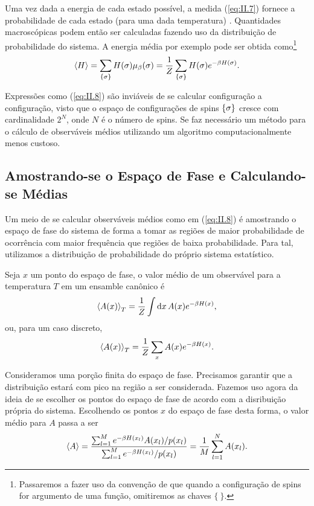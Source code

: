 Uma vez dada a energia de cada estado possível, a medida (\ref{eq:II.7}) fornece a probabilidade de cada estado (para uma dada temperatura) \cite{Huang, Schroeder}. Quantidades macroscópicas podem então ser calculadas fazendo uso da distribuição de probabilidade do sistema. A energia média por exemplo pode ser obtida como\footnote{Passaremos a fazer uso da convenção de que quando a configuração de spins for argumento de uma função, omitiremos as chaves $\{ \ \}$.}
\begin{equation}
	\ev{H} = \sum_{\sconf} H(\sigma) \mu_\beta(\sigma) = \frac{1}{Z} \sum_{\sconf} H(\sigma) e^{-\beta H(\sigma)}.
	\label{eq:II.8}
\end{equation} 

Expressões como (\ref{eq:II.8}) são inviáveis de se calcular configuração a configuração, visto que o espaço de configurações de spins $\{ \sigma \}$ cresce com cardinalidade $2^N$, onde $N$ é o número de spins. Se faz necessário um método  para o cálculo de observáveis médios utilizando um algoritmo computacionalmente menos custoso.  \cite{IsingSim}



\subsection{Amostrando-se o Espaço de Fase e Calculando-se Médias}
\label{subsec:AmostrandoseECalculandoseMedias}

Um meio de se calcular observáveis médios como em (\ref{eq:II.8}) é amostrando o espaço de fase do sistema de forma a tomar as regiões de maior probabilidade de ocorrência com maior frequência que regiões de baixa probabilidade. Para tal, utilizamos a distribuição de probabilidade do próprio sistema estatístico. 

Seja $x$ um ponto do espaço de fase, o valor médio de um observável para a temperatura $T$ em um ensamble canônico é
\begin{equation*}
	\ev{A(x)}_T = \frac{1}{Z} \int \dd{x} A(x) e^{-\beta H(x)},
\end{equation*}
ou, para um caso discreto, 
\begin{equation*}
	\ev{A(x)}_T = \frac{1}{Z} \sum_{x} A(x) e^{-\beta H(x)}. 
\end{equation*}

Consideramos uma porção finita do espaço de fase. Precisamos garantir que a distribuição estará com pico na região a ser considerada. Fazemos uso agora da ideia de se escolher os pontos do espaço de fase de acordo com a disribuição própria do sistema. Escolhendo os pontos $x$ do espaço de fase desta forma, o valor médio para $A$ passa a ser
\begin{equation*}
	\ev{A} = \frac{\sum_{l=1}^M e^{-\beta H(x_l)} A(x_l)/p(x_l)}{\sum_{l=1}^M e^{-\beta H(x_l)}/p(x_l)} = \frac{1}{M} \sum_{l=1}^N A(x_l). 
\end{equation*}

